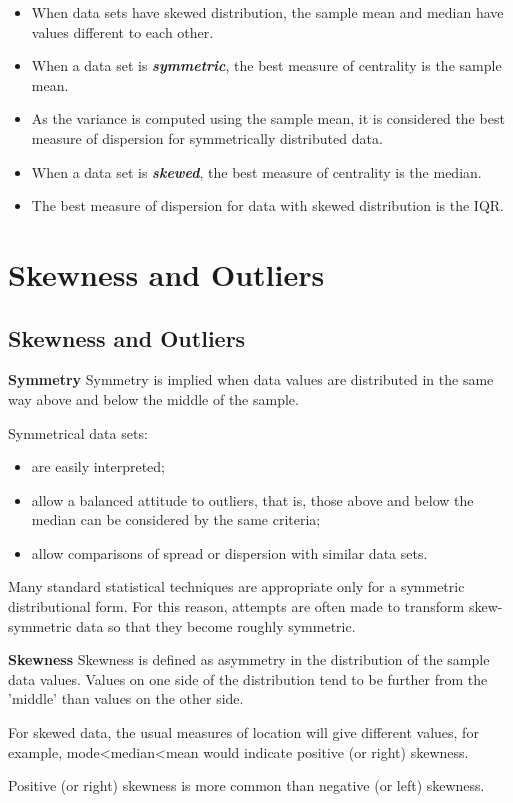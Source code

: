 \begin{itemize}
\item When data sets have skewed distribution, the sample mean and median have values different to each other.
\item When a data set is \textbf{\emph{symmetric}}, the best measure of centrality is the sample mean.
\item As the variance is computed using the sample mean, it is considered the best measure of dispersion for symmetrically distributed data. \bigskip
\item When a data set is \textbf{\emph{skewed}}, the best measure of centrality is the median.
\item The best measure of dispersion for data with skewed distribution is the IQR.
\end{itemize}














\section{Skewness and Outliers}

\subsection{Skewness and Outliers}


{
\textbf{Symmetry }
Symmetry is implied when data values are distributed in the same way above and below the middle of the sample.

Symmetrical data sets: 

\begin{itemize}
\item are easily interpreted; 
\item allow a balanced attitude to outliers, that is, those above and below the median can be considered by the same criteria; 
\item allow comparisons of spread or dispersion with similar data sets. 
\end{itemize}

Many standard statistical techniques are appropriate only for a symmetric distributional form.
For this reason, attempts are often made to transform skew-symmetric data so that they become roughly symmetric.

\textbf{Skewness} 
Skewness is defined as asymmetry in the distribution of the sample data values. Values on one side of the distribution tend to be further from the 'middle' than values on the other side.

For skewed data, the usual measures of location will give different values, for example, mode<median<mean would indicate positive (or right) skewness.

Positive (or right) skewness is more common than negative (or left) skewness.
}

